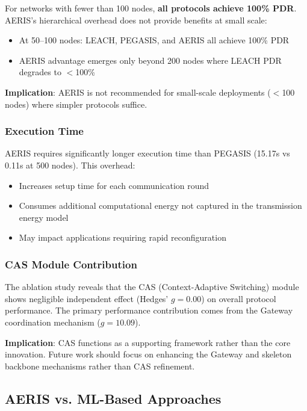 For networks with fewer than 100 nodes, \textbf{all protocols achieve 100\% PDR}.
AERIS's hierarchical overhead does not provide benefits at small scale:

\begin{itemize}
    \item At 50--100 nodes: LEACH, PEGASIS, and AERIS all achieve 100\% PDR
    \item AERIS advantage emerges only beyond 200 nodes where LEACH PDR
    degrades to $<$100\%
\end{itemize}

\textbf{Implication}: AERIS is not recommended for small-scale deployments
($<$100 nodes) where simpler protocols suffice.

\subsubsection{Execution Time}

AERIS requires significantly longer execution time than PEGASIS (15.17s vs
0.11s at 500 nodes). This overhead:

\begin{itemize}
    \item Increases setup time for each communication round
    \item Consumes additional computational energy not captured in the
    transmission energy model
    \item May impact applications requiring rapid reconfiguration
\end{itemize}

\subsubsection{CAS Module Contribution}

The ablation study reveals that the CAS (Context-Adaptive Switching)
module shows negligible independent effect (Hedges' $g = 0.00$) on
overall protocol performance. The primary performance contribution
comes from the Gateway coordination mechanism ($g = 10.09$).

\textbf{Implication}: CAS functions as a supporting framework rather
than the core innovation. Future work should focus on enhancing the
Gateway and skeleton backbone mechanisms rather than CAS refinement.

\subsection{AERIS vs. ML-Based Approaches}

